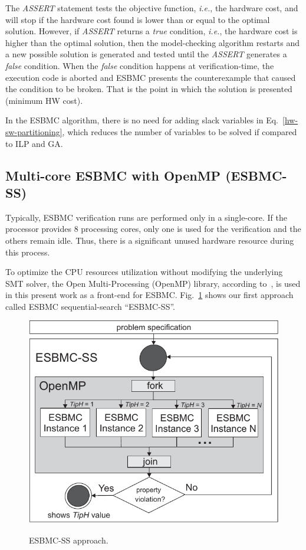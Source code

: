 \documentclass{doublecol-new}
\theoremstyle{TH}{
\newtheorem{lemma}{Lemma}
\newtheorem{theorem}[lemma]{Theorem}
\newtheorem{corrolary}[lemma]{Corrolary}
\newtheorem{conjecture}[lemma]{Conjecture}
\newtheorem{proposition}[lemma]{Proposition}
\newtheorem{claim}[lemma]{Claim}
\newtheorem{stheorem}[lemma]{Wrong Theorem}
\newtheorem{algorithm}{Algorithm}
}
\theoremstyle{THrm}{
\newtheorem{definition}{Definition}[section]
\newtheorem{question}{Question}[section]
\newtheorem{remark}{Remark}
\newtheorem{scheme}{Scheme}
}
\theoremstyle{THhit}{
\newtheorem{case}{Case}[section]
}
\begin{document}
The \textit{ASSERT} statement tests the objective function, {\it i.e.}, the hardware cost, and will stop if the hardware cost found is lower than or equal to the optimal solution. However, if \textit{ASSERT} returns a \textit{true} condition, {\it i.e.}, the hardware cost is higher than the optimal solution, then the model-checking algorithm restarts and a new possible solution is generated and tested until the \textit{ASSERT} generates a \textit{false} condition. When the \textit{false} condition happens at verification-time, the execution code is aborted and ESBMC presents the counterexample that caused the condition to be broken. That is the point in which the solution is presented (minimum HW cost).

In the ESBMC algorithm, there is no need for adding slack variables in Eq.~\eqref{hw-sw-partitioning}, which reduces the number of variables to be solved if compared to ILP and GA. 

\subsection{Multi-core ESBMC with OpenMP (ESBMC-SS)}
\label{Multi-core-ESBMC-with-OpenMP}

Typically, ESBMC verification runs are performed only in a single-core. If the processor provides $8$ processing cores, only one is used for the verification and the others remain idle. Thus, there is a significant unused hardware resource during this process. 

To optimize the CPU resources utilization without modifying the underlying SMT solver, the Open Multi-Processing (OpenMP) library, according to~\cite{Dagum1998}, is used in this present work as a front-end for ESBMC. Fig.~\ref{ESBMC-Multi-core} shows our first approach called ESBMC sequential-search ``ESBMC-SS''.

\begin{figure}[h]
	\caption{ESBMC-SS approach.}
	\centering
	\includegraphics[scale=0.77]{figures/esbmc-ss.pdf} 	
	\label{ESBMC-Multi-core}
\end{figure}
\end{document}
